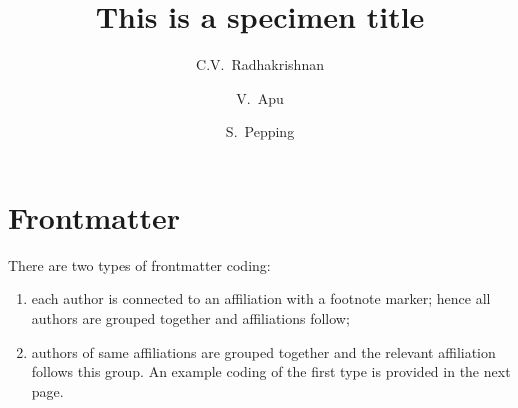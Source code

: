 \documentclass[a4paper,12pt]{article}
\begin{document}
\section{Frontmatter}
\hypertarget{frontmatter}{}

There are two types of frontmatter coding:
\begin{enumerate}[(1)]
\advance\itemsep4pt
\item each author is
connected to an affiliation with a footnote marker; hence all
authors are grouped together and affiliations follow; 
\item authors
of same affiliations are grouped together and the relevant
affiliation follows this group. An example coding of the first
type is provided in the next page.
\end{enumerate}

\begin{vquote}
 \title{This is a specimen title}
\end{vquote}

\begin{vquote}
 \author[rvt]{C.V.~Radhakrishnan}

 \author[rvt,focal]{V.~Apu}

 \author[els]{S.~Pepping}
\end{vquote}

\begin{vquote}
\end{vquote}

\begin{vquote}

 \address[rvt]{River Valley Technologies, SJP Building,
    Cotton Hills, Trivandrum, Kerala, India 695014}
 \address[focal]{River Valley Technologies, 9, Browns Court,
    Kennford, Exeter, United Kingdom}
 \address[els]{Central Application Management,
    Elsevier, Radarweg 29, 1043 NX\\
    Amsterdam, Netherlands}

\end{vquote}
\end{document}
